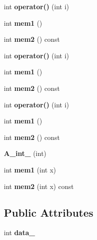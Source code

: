 \begin{DoxyCompactItemize}
int {\bfseries operator()} (int i)
\item 
\mbox{\label{struct_a__int__1_ad6cb740e082115bf4eb68e7ff07efd97}} 
int {\bfseries mem1} ()
\item 
\mbox{\label{struct_a__int__1_a61b057b1e535b41afdec8350518635c7}} 
int {\bfseries mem2} () const
\item 
\mbox{\label{struct_a__int__1_a5fe50bb0502c9f3330af638ae55cabaa}} 
int {\bfseries operator()} (int i)
\item 
\mbox{\label{struct_a__int__1_ad6cb740e082115bf4eb68e7ff07efd97}} 
int {\bfseries mem1} ()
\item 
\mbox{\label{struct_a__int__1_a61b057b1e535b41afdec8350518635c7}} 
int {\bfseries mem2} () const
\item 
\mbox{\label{struct_a__int__1_a5fe50bb0502c9f3330af638ae55cabaa}} 
int {\bfseries operator()} (int i)
\item 
\mbox{\label{struct_a__int__1_ad6cb740e082115bf4eb68e7ff07efd97}} 
int {\bfseries mem1} ()
\item 
\mbox{\label{struct_a__int__1_a61b057b1e535b41afdec8350518635c7}} 
int {\bfseries mem2} () const
\item 
\mbox{\label{struct_a__int__1_a1e28be19527361de96515b13ae703ea1}} 
{\bfseries A\+\_\+int\+\_} (int)
\item 
\mbox{\label{struct_a__int__1_a9c44be2193b43ff2f901dba6130b4028}} 
int {\bfseries mem1} (int x)
\item 
\mbox{\label{struct_a__int__1_a1a886bd966e1a19a456f4ad8b8faa4f1}} 
int {\bfseries mem2} (int x) const
\end{DoxyCompactItemize}
\subsection*{Public Attributes}
\begin{DoxyCompactItemize}
\item 
\mbox{\label{struct_a__int__1_abde97226fd4d582a52b7b2900b345a02}} 
int {\bfseries data\+\_\+}
\end{DoxyCompactItemize}


